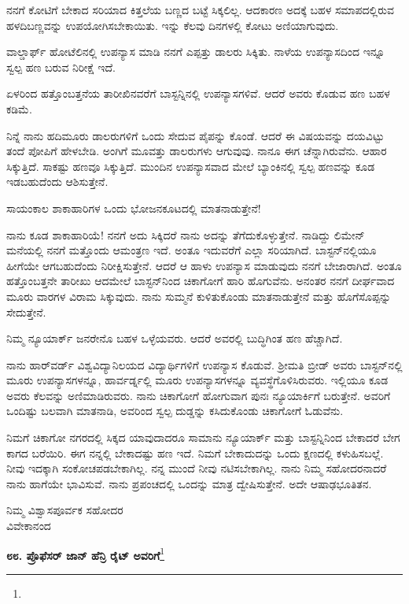 ನನಗೆ ಕೋಟಿಗೆ ಬೇಕಾದ ಸರಿಯಾದ ಕಿತ್ತಲೆಯ ಬಣ್ಣದ ಬಟ್ಟೆ ಸಿಕ್ಕಲಿಲ್ಲ. ಆದಕಾರಣ ಅದಕ್ಕೆ ಬಹಳ ಸಮಾಪದಲ್ಲಿರುವ ಹಳದಿಬಣ್ಣವನ್ನು ಉಪಯೋಗಿಸಬೇಕಾಯಿತು. ಇನ್ನು ಕೆಲವು ದಿನಗಳಲ್ಲಿ ಕೋಟು ಅಣಿಯಾಗುವುದು.

ವಾಲ್ಡಾರ್ಫ್ ಹೋಟೆಲಿನಲ್ಲಿ ಉಪನ್ಯಾಸ ಮಾಡಿ ನನಗೆ ಎಪ್ಪತ್ತು ಡಾಲರು ಸಿಕ್ಕಿತು. ನಾಳೆಯ ಉಪನ್ಯಾಸದಿಂದ ಇನ್ನೂ ಸ್ವಲ್ಪ ಹಣ ಬರುವ ನಿರೀಕ್ಷೆ ಇದೆ.

ಏಳರಿಂದ ಹತ್ತೊಂಬತ್ತನೆಯ ತಾರೀಖಿನವರೆಗೆ ಬಾಸ್ಟನ್ನಿನಲ್ಲಿ ಉಪನ್ಯಾಸಗಳಿವೆ. ಆದರೆ ಅವರು ಕೊಡುವ ಹಣ ಬಹಳ ಕಡಿಮೆ.

ನಿನ್ನೆ ನಾನು ಹದಿಮೂರು ಡಾಲರುಗಳಿಗೆ ಒಂದು ಸೇದುವ ಪೈಪನ್ನು ಕೊಂಡೆ. ಆದರೆ ಈ ವಿಷಯವನ್ನು ದಯವಿಟ್ಟು ತಂದೆ ಪೋಪಿಗೆ ಹೇಳಬೇಡಿ. ಅಂಗಿಗೆ ಮೂವತ್ತು ಡಾಲರುಗಳು ಆಗುವುವು. ನಾನೂ ಈಗ ಚೆನ್ನಾಗಿರುವೆನು. ಆಹಾರ ಸಿಕ್ಕುತ್ತಿದೆ. ಸಾಕಷ್ಟು ಹಣವೂ ಸಿಕ್ಕುತ್ತಿದೆ. ಮುಂದಿನ ಉಪನ್ಯಾಸವಾದ ಮೇಲೆ ಬ್ಯಾಂಕಿನಲ್ಲಿ ಸ್ವಲ್ಪ ಹಣವನ್ನು ಕೂಡ ಇಡಬಹುದೆಂದು ಆಶಿಸುತ್ತೇನೆ.

ಸಾಯಂಕಾಲ ಶಾಕಾಹಾರಿಗಳ ಒಂದು ಭೋಜನಕೂಟದಲ್ಲಿ ಮಾತನಾಡುತ್ತೇನೆ!

ನಾನು ಕೂಡ ಶಾಕಾಹಾರಿಯೆ! ನನಗೆ ಅದು ಸಿಕ್ಕಿದರೆ ನಾನು ಅದನ್ನು ತೆಗೆದುಕೊಳ್ಳುತ್ತೇನೆ. ನಾಡಿದ್ದು ಲಿಮೇನ್ ಮನೆಯಲ್ಲಿ ನನಗೆ ಮತ್ತೊಂದು ಆಮಂತ್ರಣ ಇದೆ. ಅಂತೂ ಇದುವರೆಗೆ ಎಲ್ಲಾ ಸರಿಯಾಗಿದೆ. ಬಾಸ್ಟನ್‌ನಲ್ಲಿಯೂ ಹೀಗೆಯೇ ಆಗಬಹುದೆಂದು ನಿರೀಕ್ಷಿಸುತ್ತೇನೆ. ಆದರೆ ಆ ಹಾಳು ಉಪನ್ಯಾಸ ಮಾಡುವುದು ನನಗೆ ಬೇಜಾರಾಗಿದೆ. ಅಂತೂ ಹತ್ತೊಂಬತ್ತನೇ ತಾರೀಖು ಆದಮೇಲೆ ಬಾಸ್ಟನ್‌ನಿಂದ ಚಿಕಾಗೋಗೆ ಹಾರಿ ಹೊಗುವೆನು. ಅನಂತರ ನನಗೆ ದೀರ್ಘವಾದ ಮೂರು ವಾರಗಳ ವಿರಾಮ ಸಿಕ್ಕುವುದು. ನಾನು ಸುಮ್ಮನೆ ಕುಳಿತುಕೊಂಡು ಮಾತನಾಡುತ್ತೇನೆ ಮತ್ತು ಹೊಗೆಸೊಪ್ಪನ್ನು ಸೇದುತ್ತೇನೆ.

ನಿಮ್ಮ ನ್ಯೂಯಾರ್ಕ್ ಜನರೇನೊ ಬಹಳ ಒಳ್ಳೆಯವರು. ಆದರೆ ಅವರಲ್ಲಿ ಬುದ್ಧಿಗಿಂತ ಹಣ ಹೆಚ್ಚಾಗಿದೆ.

ನಾನು ಹಾರ್‌ವರ್ಡ್ ವಿಶ್ವವಿದ್ಯಾನಿಲಯದ ವಿದ್ಯಾರ್ಥಿಗಳಿಗೆ ಉಪನ್ಯಾಸ ಕೊಡುವೆ. ಶ‍್ರೀಮತಿ ಬ್ರೀಡ್ ಅವರು ಬಾಸ್ಟನ್‌ನಲ್ಲಿ ಮೂರು ಉಪನ್ಯಾಸಗಳನ್ನೂ, ಹಾರ್ವರ್ಡ್ನಲ್ಲಿ ಮೂರು ಉಪನ್ಯಾಸಗಳನ್ನೂ ವ್ಯವಸ್ಥೆಗೊಳಿಸಿರುವರು. ಇಲ್ಲಿಯೂ ಕೂಡ ಅವರು ಕೆಲವನ್ನು ಅಣಿಮಾಡಿರುವರು. ನಾನು ಚಿಕಾಗೋಗೆ ಹೋಗುವಾಗ ಪುನಃ ನ್ಯೂಯಾರ್ಕಿಗೆ ಬರುತ್ತೇನೆ. ಅವರಿಗೆ ಒಂದಿಷ್ಟು ಬಲವಾಗಿ ಮಾತನಾಡಿ, ಅವರಿಂದ ಸ್ವಲ್ಪ ದುಡ್ಡನ್ನು ಕಸಿದುಕೊಂಡು ಚಿಕಾಗೋಗೆ ಓಡುವೆನು.

ನಿಮಗೆ ಚಿಕಾಗೋ ನಗರದಲ್ಲಿ ಸಿಕ್ಕದ ಯಾವುದಾದರೂ ಸಾಮಾನು ನ್ಯೂಯಾರ್ಕ್ ಮತ್ತು ಬಾಸ್ಟನ್ನಿನಿಂದ ಬೇಕಾದರೆ ಬೇಗ ಕಾಗದ ಬರೆಯಿರಿ. ಈಗ ನನ್ನಲ್ಲಿ ಬೇಕಾದಷ್ಟು ಹಣ ಇದೆ. ನಿಮಗೆ ಬೇಕಾದುದನ್ನು ಒಂದು ಕ್ಷಣದಲ್ಲಿ ಕಳುಹಿಸಬಲ್ಲೆ. ನೀವು ಇದಕ್ಕಾಗಿ ಸಂಕೋಚಪಡಬೇಕಾಗಿಲ್ಲ. ನನ್ನ ಮುಂದೆ ನೀವು ನಟಿಸಬೇಕಾಗಿಲ್ಲ. ನಾನು ನಿಮ್ಮ ಸಹೋದರನಾದರೆ ನಾನು ಹಾಗೆಯೇ ಭಾವಿಸುವೆ. ನಾನು ಪ್ರಪಂಚದಲ್ಲಿ ಒಂದನ್ನು ಮಾತ್ರ ದ್ವೇಷಿಸುತ್ತೇನೆ. ಅದೇ ಆಷಾಢಭೂತಿತನ.

{\flushright
ನಿಮ್ಮ ವಿಶ್ವಾಸಪೂರ್ವಕ ಸಹೋದರ\\ವಿವೇಕಾನಂದ\par}

\newpage

\begin{center}
\textbf{೮೮. ಪ್ರೊಫೆಸರ್ ಜಾನ್ ಹೆನ್ರಿ ರೈಟ್ ಅವರಿಗೆ}\footnote{}
\end{center}

